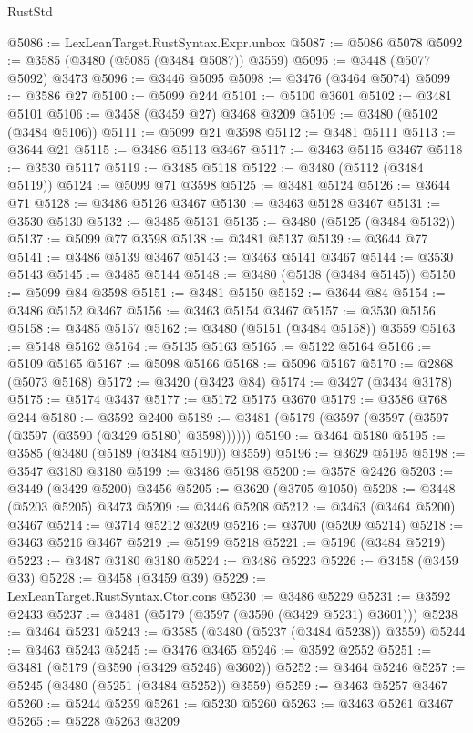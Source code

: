 \begin{lexlean}{RustStd}
\begin{coremodule}
{\begin{coremodule}
{{{{{{{{{{{{{{{{{{{{{{{{{{{{{{{{{{{{{{{{{{{{{{{{{{{{{{{{{{{{{{{{{{{{{{{{{{{{{{{{{{{{{@5086 := LexLeanTarget.RustSyntax.Expr.unbox
@5087 := @5086 @5078
@5092 := @3585 (@3480 (@5085 (@3484 @5087)) @3559)
@5095 := @3448 (@5077 @5092) @3473
@5096 := @3446 @5095
@5098 := @3476 (@3464 @5074)
@5099 := @3586 @27
@5100 := @5099 @244
@5101 := @5100 @3601
@5102 := @3481 @5101
@5106 := @3458 (@3459 @27) @3468 @3209
@5109 := @3480 (@5102 (@3484 @5106))
@5111 := @5099 @21 @3598
@5112 := @3481 @5111
@5113 := @3644 @21
@5115 := @3486 @5113 @3467
@5117 := @3463 @5115 @3467
@5118 := @3530 @5117
@5119 := @3485 @5118
@5122 := @3480 (@5112 (@3484 @5119))
@5124 := @5099 @71 @3598
@5125 := @3481 @5124
@5126 := @3644 @71
@5128 := @3486 @5126 @3467
@5130 := @3463 @5128 @3467
@5131 := @3530 @5130
@5132 := @3485 @5131
@5135 := @3480 (@5125 (@3484 @5132))
@5137 := @5099 @77 @3598
@5138 := @3481 @5137
@5139 := @3644 @77
@5141 := @3486 @5139 @3467
@5143 := @3463 @5141 @3467
@5144 := @3530 @5143
@5145 := @3485 @5144
@5148 := @3480 (@5138 (@3484 @5145))
@5150 := @5099 @84 @3598
@5151 := @3481 @5150
@5152 := @3644 @84
@5154 := @3486 @5152 @3467
@5156 := @3463 @5154 @3467
@5157 := @3530 @5156
@5158 := @3485 @5157
@5162 := @3480 (@5151 (@3484 @5158)) @3559
@5163 := @5148 @5162
@5164 := @5135 @5163
@5165 := @5122 @5164
@5166 := @5109 @5165
@5167 := @5098 @5166
@5168 := @5096 @5167
@5170 := @2868 (@5073 @5168)
@5172 := @3420 (@3423 @84)
@5174 := @3427 (@3434 @3178)
@5175 := @5174 @3437
@5177 := @5172 @5175 @3670
@5179 := @3586 @768 @244
@5180 := @3592 @2400
@5189 := @3481 (@5179 (@3597 (@3597 (@3597 (@3597 (@3590 (@3429 @5180) @3598))))))
@5190 := @3464 @5180
@5195 := @3585 (@3480 (@5189 (@3484 @5190)) @3559)
@5196 := @3629 @5195
@5198 := @3547 @3180 @3180
@5199 := @3486 @5198
@5200 := @3578 @2426
@5203 := @3449 (@3429 @5200) @3456
@5205 := @3620 (@3705 @1050)
@5208 := @3448 (@5203 @5205) @3473
@5209 := @3446 @5208
@5212 := @3463 (@3464 @5200) @3467
@5214 := @3714 @5212 @3209
@5216 := @3700 (@5209 @5214)
@5218 := @3463 @5216 @3467
@5219 := @5199 @5218
@5221 := @5196 (@3484 @5219)
@5223 := @3487 @3180 @3180
@5224 := @3486 @5223
@5226 := @3458 (@3459 @33)
@5228 := @3458 (@3459 @39)
@5229 := LexLeanTarget.RustSyntax.Ctor.cons
@5230 := @3486 @5229
@5231 := @3592 @2433
@5237 := @3481 (@5179 (@3597 (@3590 (@3429 @5231) @3601)))
@5238 := @3464 @5231
@5243 := @3585 (@3480 (@5237 (@3484 @5238)) @3559)
@5244 := @3463 @5243
@5245 := @3476 @3465
@5246 := @3592 @2552
@5251 := @3481 (@5179 (@3590 (@3429 @5246) @3602))
@5252 := @3464 @5246
@5257 := @5245 (@3480 (@5251 (@3484 @5252)) @3559)
@5259 := @3463 @5257 @3467
@5260 := @5244 @5259
@5261 := @5230 @5260
@5263 := @3463 @5261 @3467
@5265 := @5228 @5263 @3209
}}}}}}}}}}}}}}}}}}}}}}}}}}}}}}}}}}}}}}}}}}}}}}}}}}}}}}}}}}}}}}}}}}}}}}}}}}}}}}}}}}}}}
\end{coremodule}}
\end{coremodule}
\end{lexlean}

